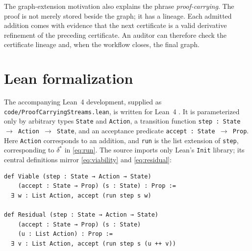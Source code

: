 \documentclass[11pt]{article}
\theoremstyle{definition}
\newcommand{\Run}{\delta^{*}}
\begin{document}
The graph-extension motivation also explains the phrase \emph{proof-carrying}. The proof is not merely stored beside the graph; it has a lineage. Each admitted addition comes with evidence that the next certificate is a valid derivative refinement of the preceding certificate. An auditor can therefore check the certificate lineage and, when the workflow closes, the final graph.

\section{Lean formalization}\label{sec:lean}

The accompanying Lean~4 development, supplied as \texttt{code/ProofCarryingStreams.lean}, is written for Lean~4 \cite{demoura2021lean}. It is parameterized only by arbitrary types \texttt{State} and \texttt{Action}, a transition function \texttt{step : State $\to$ Action $\to$ State}, and an acceptance predicate \texttt{accept : State $\to$ Prop}. Here \texttt{Action} corresponds to an addition, and \texttt{run} is the list extension of \texttt{step}, corresponding to $\Run$ in \eqref{eq:run}. The source imports only Lean's \texttt{Init} library; its central definitions mirror \eqref{eq:viability} and \eqref{eq:residual}:

\begin{lstlisting}
def Viable (step : State → Action → State)
    (accept : State → Prop) (s : State) : Prop :=
  ∃ w : List Action, accept (run step s w)

def Residual (step : State → Action → State)
    (accept : State → Prop) (s : State)
    (u : List Action) : Prop :=
  ∃ v : List Action, accept (run step s (u ++ v))
\end{lstlisting}
\end{document}
